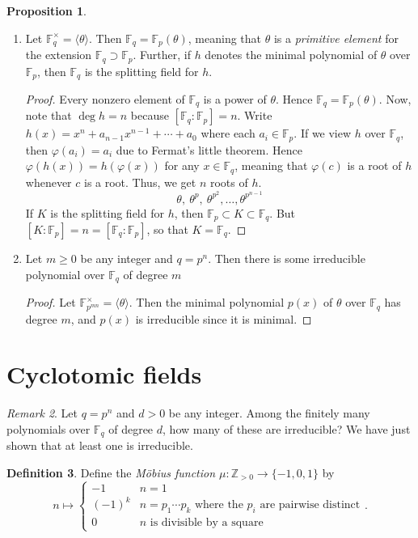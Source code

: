 \documentclass[10pt,letterpaper,cm]{nupset}
\theoremstyle{definition}
\newtheorem{definition}{Definition}[subsection]
\theoremstyle{theorem}
\newtheorem{prop}[definition]{Proposition}
\theoremstyle{remark}
\newtheorem{remark}[definition]{Remark}
\newcommand{\F}{\mathbb F}
\newcommand{\Z}{\mathbb Z}
\newcommand{\1}{\mathbf{1}}
\newcommand{\0}{\vec 0}
\begin{document}
\begin{prop} $ $
\begin{enumerate}
\item Let $\F_q^{\times} = \langle \theta \rangle$. Then $\F_q =\F_p(\theta)$, meaning that $\theta$ is a \textit{primitive element} for the extension $\F_q \supset \F_p$. Further, if $h$ denotes the minimal polynomial of $\theta$ over $\F_p$, then $\F_q$ is the splitting field for $h$.
\begin{proof}
Every nonzero element of $\F_q$ is a power of $\theta$. Hence $\F_q = \F_p(\theta)$. Now, note that $\deg{h} = n$ because $[\F_q : \F_p]=n$. Write $h(x) = x^n +a_{n-1}x^{n-1}+\cdots + a_0$ where each $a_i \in \F_p$. If we view $h$ over $\F_q$, then $\varphi(a_i) = a_i$ due to Fermat's little theorem. Hence $\varphi(h(x)) = h(\varphi(x))$ for any $x\in \F_q$, meaning that $\varphi(c)$ is a root of $h$ whenever $c$ is a root. Thus, we get $n$ roots of $h$. $$ \theta, \ \theta^p, \ \theta^{p^2}, \ldots, \theta^{p^{n-1}}   $$ If $K$ is the splitting field for $h$, then $\F_p \subset K \subset \F_q$. But $[K :\F_p] = n = [\F_q: \F_p]$, so that $K = \F_q$.
\end{proof}
\item Let $m\geq 0$ be any integer and $q=p^n$. Then there is some irreducible polynomial over $\F_q$ of degree $m$
\begin{proof}
Let $\F_{p^{mn}}^{\times}=\langle \theta \rangle $. Then the minimal polynomial $p(x)$ of $\theta$ over $\F_q$ has degree $m$, and $p(x)$ is irreducible since it is minimal.
\end{proof}
\end{enumerate}
\end{prop}

\section{Cyclotomic fields}

\begin{remark}
Let $q=p^n$ and $d>0$ be any integer. Among the finitely many polynomials over $\F_q$ of degree $d$, how many of these are irreducible? We have just shown that at least one is irreducible. 
\end{remark}

\begin{definition}
Define the \textit{M\"{o}bius function $\mu : \Z_{>0} \to \{{-}1, 0, 1\}$} by $$n \mapsto \begin{cases} {-}1 & n=1\\ ({-}1)^k & n = p_1\cdots p_k \text{ where the } p_i \text{ are pairwise distinct} \\ 0 & n \text{ is divisible by a square}     \end{cases}    .$$
\end{definition}
\end{document}
